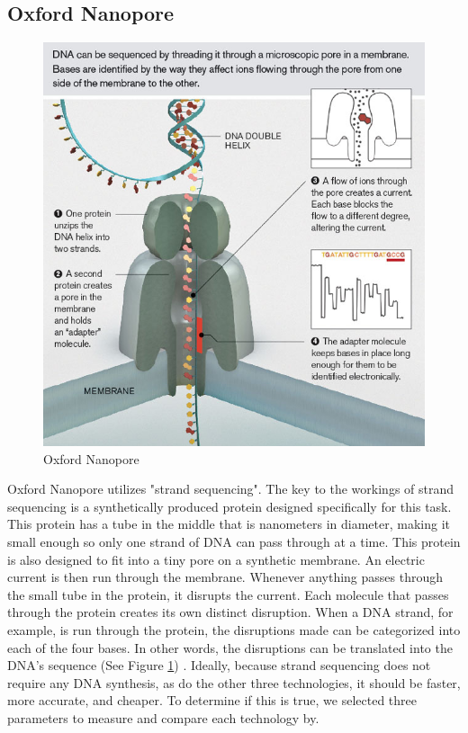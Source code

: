 \documentclass[12pt,letterpaper]{report}
\begin{document}
\subsection{Oxford Nanopore}
\begin{figure}
\vspace{-30pt}
  \begin{center}
    \includegraphics[scale=.35]{oxford_fig.png}
  \end{center}
  \vspace{-20pt}
  \caption{Oxford Nanopore}
  \vspace{-10pt}
  \label{fig:oxford}
\end{figure}

Oxford Nanopore utilizes "strand sequencing". The key to the workings of strand sequencing is a synthetically produced protein designed specifically for this task. This protein has a tube in the middle that is nanometers in diameter, making it small enough so only one strand of DNA can pass through at a time. This protein is also designed to fit into a tiny pore on a synthetic membrane. An electric current is then run through the membrane. Whenever anything passes through the small tube in the protein, it disrupts the current. Each molecule that passes through the protein creates its own distinct disruption. When a DNA strand, for example, is run through the protein, the disruptions made can be categorized into each of the four bases. In other words, the disruptions can be translated into the DNA's sequence (See Figure \ref{fig:oxford}) \cite{nanoporesite}. Ideally, because strand sequencing does not require any DNA synthesis, as do the other three technologies, it should be faster, more accurate, and cheaper. To determine if this is true, we selected three parameters to measure and compare each technology by. 
\end{document}
